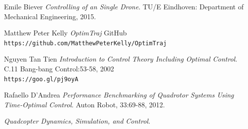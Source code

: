 \documentclass[12pt]{article}
\begin{document}
\begin{thebibliography}{9}


Emile Biever
\textit{Controlling of an Single Drone}.
TU/E Eindhoven: Department of Mechanical Engineering, 2015.



Matthew Peter Kelly
\textit{OptimTraj}
GitHub
\\\texttt{https://github.com/MatthewPeterKelly/OptimTraj}


Nguyen Tan Tien
\textit{Introduction to Control Theory Including Optimal Control}.
C.11 Bang-bang Control:53-58, 2002
\\\texttt{https://goo.gl/pj9oyA}



Rafaello D'Andrea
\textit{Performance Benchmarking of Quadrotor Systems Using Time-Optimal Control}.
Auton Robot, 33:69-88, 2012.



\textit{Quadcopter Dynamics, Simulation, and Control}.











\end{thebibliography}


\end{document}
